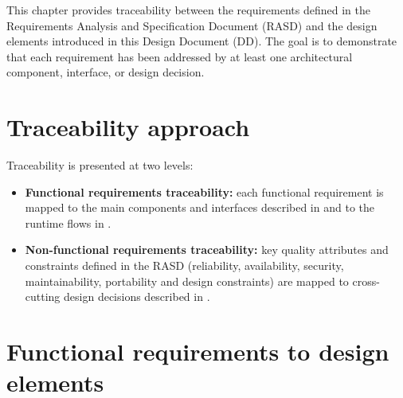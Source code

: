 This chapter provides traceability between the requirements defined in the Requirements Analysis and Specification Document (RASD) and the design elements introduced in this Design Document (DD). The goal is to demonstrate that each requirement has been addressed by at least one architectural component, interface, or design decision.

\section{Traceability approach}
\label{sec:traceability_approach}%

Traceability is presented at two levels:
\begin{itemize}
    \item \textbf{Functional requirements traceability:} each functional requirement is mapped to the main components and interfaces described in  and to the runtime flows in .
    \item \textbf{Non-functional requirements traceability:} key quality attributes and constraints defined in the RASD (reliability, availability, security, maintainability, portability and design constraints) are mapped to cross-cutting design decisions described in .
\end{itemize}

\section{Functional requirements to design elements}
\label{sec:fr_to_design}%

